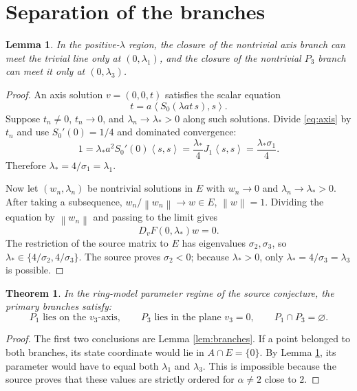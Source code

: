 \documentclass[11pt]{article}
\newtheorem{theorem}{Theorem}
\newtheorem{lemma}{Lemma}
\newcommand{\ip}[2]{\left\langle #1,#2\right\rangle}
\newcommand{\norm}[1]{\left\lVert #1\right\rVert}
\begin{document}
\section{Separation of the branches}

\begin{lemma}\label{lem:trivial}
In the positive-\(\lambda\) region, the closure of the nontrivial axis branch
can meet the trivial line only at \((0,\lambda_1)\), and the closure of the
nontrivial \(P_3\) branch can meet it only at \((0,\lambda_3)\).
\end{lemma}

\begin{proof}
An axis solution \(v=(0,0,t)\) satisfies the scalar equation
\begin{equation}\label{eq:axis}
 t=a\ip{S_0(\lambda at\,s)}{s}.
\end{equation}
Suppose \(t_n\neq0\), \(t_n\to0\), and
\(\lambda_n\to\lambda_*>0\) along such solutions.  Divide
\eqref{eq:axis} by \(t_n\) and use
\(S_0'(0)=1/4\) and dominated convergence:
\[
 1=\lambda_*a^2S_0'(0)\ip{s}{s}
   =\frac{\lambda_*}{4}J_1\ip{s}{s}
   =\frac{\lambda_*\sigma_1}{4}.
\]
Therefore \(\lambda_*=4/\sigma_1=\lambda_1\).

Now let \((w_n,\lambda_n)\) be nontrivial solutions in \(E\) with
\(w_n\to0\) and \(\lambda_n\to\lambda_*>0\).  After taking a subsequence,
\(w_n/\norm{w_n}\to w\in E\), \(\norm{w}=1\).  Dividing the equation by
\(\norm{w_n}\) and passing to the limit gives
\[
 D_vF(0,\lambda_*)w=0.
\]
The restriction of the source matrix to \(E\) has eigenvalues
\(\sigma_2,\sigma_3\), so
\(\lambda_*\in\{4/\sigma_2,4/\sigma_3\}\).
The source proves \(\sigma_2<0\); because \(\lambda_*>0\), only
\(\lambda_*=4/\sigma_3=\lambda_3\) is possible.
\end{proof}

\begin{theorem}\label{thm:main}
In the ring-model parameter regime of the source conjecture, the primary
branches satisfy:
\[
 P_1\text{ lies on the }v_3\text{-axis},\qquad
 P_3\text{ lies in the plane }v_3=0,\qquad
 P_1\cap P_3=\varnothing.
\]
\end{theorem}

\begin{proof}
The first two conclusions are Lemma \ref{lem:branches}.  If a point belonged
to both branches, its state coordinate would lie in
\(A\cap E=\{0\}\).  By Lemma \ref{lem:trivial}, its parameter would have to
equal both \(\lambda_1\) and \(\lambda_3\).  This is impossible because the
source proves that these values are strictly ordered for
\(\alpha\neq2\) close to \(2\).
\end{proof}
\end{document}
